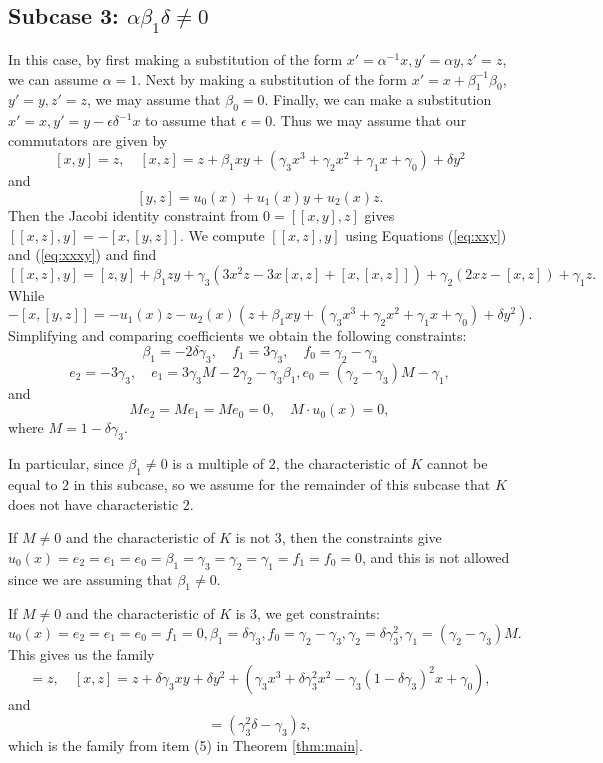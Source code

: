 \documentclass[a4paper,11pt,twoside,notitlepage,reqno]{amsart}
\theoremstyle{plain}
\numberwithin{thm}{section}
\theoremstyle{definition}
\begin{document}
\subsection{Subcase 3: $\alpha\beta_1\delta\neq 0$}
In this case, by first making a substitution of the form $x'=\alpha^{-1} x, y'=\alpha y, z'=z$, we can assume $\alpha=1$. Next by making a substitution of the form $x'=x+\beta_1^{-1}\beta_0$, $y'=y, z'=z$, we may assume that $\beta_0=0$.  Finally, we can make a substitution $x'=x, y'=y-\epsilon \delta^{-1} x$ to assume that $\epsilon =0$.  Thus we may assume that our commutators are given by
$$[x,y]=z,\quad [x,z]= z + \beta_1 x y + (\gamma_3 x^3+ \gamma_2 x^2 + \gamma_1 x + \gamma_0 ) +\delta y^2$$
and
$$[y,z]= u_0(x) + u_1(x) y + u_2(x) z.$$
Then the Jacobi identity constraint from $0=[[x,y],z]$ gives $[[x,z],y]= -[x,[y,z]]$. 
We compute $[[x,z],y]$ using Equations (\ref{eq:xxy}) and (\ref{eq:xxxy}) and find
$$[[x,z],y] = [z,y] + \beta_1 zy + \gamma_3 (3x^2 z-3x[x,z]+[x,[x,z]]) + \gamma_2 (2xz -[x,z]) + \gamma_1 z.$$
While $$-[x,[y,z]]= -u_1(x) z - u_2(x) (z+\beta_1 xy +(\gamma_3 x^3+ \gamma_2 x^2 + \gamma_1 x + \gamma_0 ) +\delta y^2).$$
Simplifying and comparing coefficients we obtain the following constraints:
$$\beta_1 =- 2\delta\gamma_3, \quad f_1 = 3\gamma_3, \quad  f_0 = \gamma_2 - \gamma_3 $$
 $$e_2 = -3\gamma_3, \quad e_1 = 3\gamma_3 M - 2\gamma_2 - \gamma_3\beta_1, 
    e_0 = (\gamma_2-\gamma_3)M - \gamma_1,$$
    and $$M e_2  = M e_1 = M e_0=0,\quad M \cdot u_0(x) =0,$$
   where $ M = 1-\delta\gamma_3$.
   
In particular, since $\beta_1\neq 0$ is a multiple of $2$, the characteristic of $K$ cannot be equal to $2$ in this subcase, so we assume for the remainder of this subcase that $K$ does not have characteristic $2$.

If $M\neq 0$ and the characteristic of $K$ is not $3$, then the constraints give $u_0(x)=e_2=e_1=e_0=\beta_1=\gamma_3=\gamma_2=\gamma_1=f_1=f_0=0$, and this is not allowed since we are assuming that $\beta_1\neq 0$.

If $M\neq 0$ and the characteristic of $K$ is $3$, we get constraints:
$$u_0(x)=e_2=e_1=e_0=f_1=0, \beta_1=\delta \gamma_3, f_0=\gamma_2-\gamma_3, \gamma_2=\delta \gamma_3^2, \gamma_1=(\gamma_2-\gamma_3)M.$$
This gives us the family
\begin{equation}
[x,y]=z,\quad [x,z]= z +\delta\gamma_3xy + \delta y^2 + (\gamma_3 x^3 +\delta \gamma_3^2 x^2-\gamma_3 (1-\delta \gamma_3)^2 x+\gamma_0),
\end{equation}
and
\begin{equation} [y,z]= (\gamma_3^2\delta -\gamma_3)z,
\end{equation}
which is the family from item (5) in Theorem \ref{thm:main}.
\end{document}
